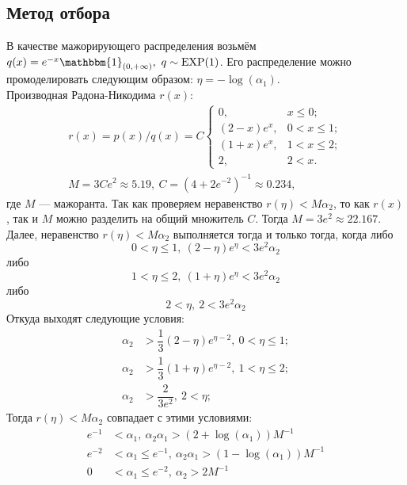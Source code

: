 \documentclass[specialist,
substylefile = spbu_report.rtx,
subf,href,colorlinks=true, 12pt]{disser}
\begin{document}
	\subsection{Метод отбора}
	В качестве мажорирующего распределения возьмём $q(x) = e^{-x}\mathbbm{1}_{(0,+\infty)},~q\sim\mathrm{EXP}(1)$. Его распределение можно промоделировать следующим образом: $\eta = -\log(\alpha_1)$.
	\\Производная Радона-Никодима $r(x)$:
	\begin{align*}
		r(x)=p(x)/q(x)=C
		\begin{cases}
			0,& x\leqslant0;\\
			(2-x)e^{x},& 0<x\leqslant 1;\\
			(1+x)e^{x},& 1<x\leqslant 2;\\
			2,& 2<x.
		\end{cases}
		\\M = 3Ce^2\approx5.19,~C=(4+2e^{-2})^{-1}\approx0.234,
	\end{align*}
	где $M$ --- мажоранта. Так как проверяем неравенство $r(\eta)<M\alpha_2$, то как $r(x)$, так и $M$ можно разделить на общий множитель $C$. Тогда $M = 3e^2 \approx 22.167$.\\
	Далее, неравенство $r(\eta)<M\alpha_2$ выполняется тогда и только тогда, когда либо
	\begin{equation*}
		0<\eta\leqslant1,~(2-\eta)e^\eta < 3e^2\alpha_2
	\end{equation*}
	либо
	\begin{equation*}
		1<\eta\leqslant2,~(1+\eta)e^\eta < 3e^2\alpha_2
	\end{equation*}
	либо
	\begin{equation*}
		2<\eta,~2<3e^2\alpha_2
	\end{equation*}
	Откуда выходят следующие условия:
	\begin{align}
		\alpha_2&>\dfrac{1}{3}(2-\eta)e^{\eta-2},~0<\eta\leqslant1;\label{eq:1}\\
		\alpha_2&>\dfrac{1}{3}(1+\eta)e^{\eta-2},~1<\eta\leqslant2;\label{eq:2}\\
		\alpha_2&>\dfrac{2}{3e^2},~2<\eta;\label{eq:3}
	\end{align}
	Тогда $r(\eta) < M\alpha_2$ совпадает с этими условиями:
	\begin{align}
		e^{-1}&<\alpha_1,~\alpha_2\alpha_1>(2+\log(\alpha_1))M^{-1}\tag{1}
		\\e^{-2}&<\alpha_1\leqslant e^{-1},~\alpha_2\alpha_1>(1-\log(\alpha_1))M^{-1}\tag{2}
		\\0&<\alpha_1\leqslant e^{-2},~\alpha_2>2M^{-1}\tag{3}
	\end{align}
\end{document}
